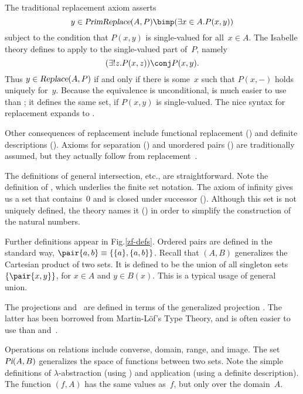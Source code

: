The traditional replacement axiom asserts
\[ y \in \isa{PrimReplace}(A,P) \bimp (\exists x\in A. P(x,y)) \]
subject to the condition that $P(x,y)$ is single-valued for all~$x\in A$.
The Isabelle theory defines  to apply
 to the single-valued part of~$P$, namely
\[ (\exists!z. P(x,z)) \conj P(x,y). \]
Thus $y\in \emph{\sl Replace}(A,P)$ if and only if there is some~$x$ such that
$P(x,-)$ holds uniquely for~$y$.  Because the equivalence is unconditional,
 is much easier to use than ; it defines the
same set, if $P(x,y)$ is single-valued.  The nice syntax for replacement
expands to .

Other consequences of replacement include functional replacement
() and definite descriptions ().
Axioms for separation () and unordered pairs
() are traditionally assumed, but they actually follow
from replacement~\cite[pages 237--8]{suppes72}.

The definitions of general intersection, etc., are straightforward.  Note
the definition of , which underlies the finite set notation.
The axiom of infinity gives us a set that contains~0 and is closed under
successor ().  Although this set is not uniquely defined,
the theory names it () in order to simplify the
construction of the natural numbers.
                                             
Further definitions appear in Fig.\ts\ref{zf-defs}.  Ordered pairs are
defined in the standard way, $\pair{a,b}\equiv\{\{a\},\{a,b\}\}$.  Recall
that $(A,B)$ generalizes the Cartesian product of two
sets.  It is defined to be the union of all singleton sets
$\{\pair{x,y}\}$, for $x\in A$ and $y\in B(x)$.  This is a typical usage of
general union.

The projections  and~ are defined in terms of the
generalized projection .  The latter has been borrowed from
Martin-L\"of's Type Theory, and is often easier to use than 
and~.

Operations on relations include converse, domain, range, and image.  The
set $\emph{\sl Pi}(A,B)$ generalizes the space of functions between two sets.
Note the simple definitions of $\lambda$-abstraction (using
) and application (using a definite description).  The
function $(f,A)$ has the same values as~$f$, but only
over the domain~$A$.



